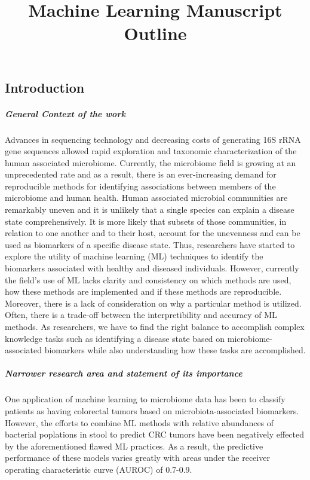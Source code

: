 \documentclass[11pt,]{article}
\title{Machine Learning Manuscript Outline}
\author{}
\date{}
\let\oldsubparagraph\subparagraph
\renewcommand{\subparagraph}[1]{\oldsubparagraph{#1}\mbox{}}
\begin{document}
\maketitle

\subsection{Introduction}\label{introduction}

\subparagraph{General Context of the
work}\label{general-context-of-the-work}

Advances in sequencing technology and decreasing costs of generating 16S
rRNA gene sequences allowed rapid exploration and taxonomic
characterization of the human associated microbiome. Currently, the
microbiome field is growing at an unprecedented rate and as a result,
there is an ever-increasing demand for reproducible methods for
identifying associations between members of the microbiome and human
health. Human associated microbial communities are remarkably uneven and
it is unlikely that a single species can explain a disease state
comprehensively. It is more likely that subsets of those communities, in
relation to one another and to their host, account for the unevenness
and can be used as biomarkers of a specific disease state. Thus,
researchers have started to explore the utility of machine learning (ML)
techniques to identify the biomarkers associated with healthy and
diseased individuals. However, currently the field's use of ML lacks
clarity and consistency on which methods are used, how these methods are
implemented and if these methods are reproducible. Moreover, there is a
lack of consideration on why a particular method is utilized. Often,
there is a trade-off between the interpretibility and accuracy of ML
methods. As researchers, we have to find the right balance to accomplish
complex knowledge tasks such as identifying a disease state based on
microbiome-associated biomarkers while also understanding how these
tasks are accomplished.

\subparagraph{Narrower research area and statement of its
importance}\label{narrower-research-area-and-statement-of-its-importance}

One application of machine learning to microbiome data has been to
classify patients as having colorectal tumors based on
microbiota-associated biomarkers. However, the efforts to combine ML
methods with relative abundances of bacterial poplations in stool to
predict CRC tumors have been negatively effected by the aforementioned
flawed ML practices. As a result, the predictive performance of these
models varies greatly with areas under the receiver operating
characteristic curve (AUROC) of 0.7-0.9.
\end{document}
